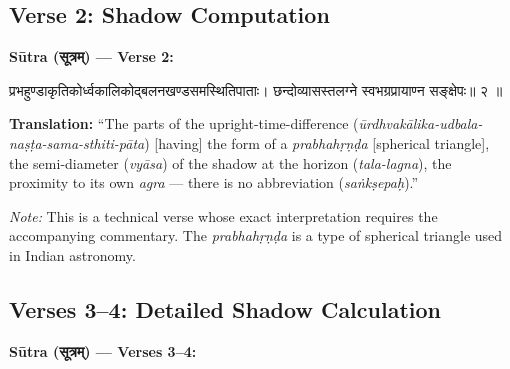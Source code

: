 \documentclass[11pt,a4paper]{article}
\newcommand{\dev}[1]{{\devanagarifont #1}}
\newenvironment{sanskritverse}{%
  \begin{center}\begin{minipage}{0.95\textwidth}
  \setlength{\leftskip}{1em}
  \setlength{\rightskip}{1em}
  \dev
}{\end{minipage}\end{center}}
\newenvironment{paracol}[1]{\begingroup}{\endgroup}
\newcommand{\switchcolumn}[1][]{%
  \ifnum#1=0\relax\else\par\nobreak\vspace{0.5em}\par\nobreak\fi%
}
\begin{document}
\subsection{Verse 2: Shadow Computation}

\vspace{0.5em}
\noindent\textbf{Sūtra (\dev{सूत्रम्}) — Verse 2:}

\begin{paracol}{2}

\begin{sanskritverse}
प्रभहुण्डाकृतिकोर्ध्वकालिकोद्बलनखण्डसमस्थितिपाताः।
छन्दोव्यासस्तलग्ने स्वभग्रप्रायाण्न सङ्क्षेपः॥ २ ॥
\end{sanskritverse}

\switchcolumn

\textbf{Translation:} ``The parts of the upright-time-difference (\textit{ūrdhvakālika-udbala-naṣṭa-sama-sthiti-pāta}) [having] the form of a \textit{prabhahṛṇḍa} [spherical triangle], the semi-diameter (\textit{vyāsa}) of the shadow at the horizon (\textit{tala-lagna}), the proximity to its own \textit{agra} --- there is no abbreviation (\textit{saṅkṣepaḥ}).''

\textit{Note:} This is a technical verse whose exact interpretation requires the accompanying commentary. The \textit{prabhahṛṇḍa} is a type of spherical triangle used in Indian astronomy.

\end{paracol}

\subsection{Verses 3--4: Detailed Shadow Calculation}

\vspace{0.5em}
\noindent\textbf{Sūtra (\dev{सूत्रम्}) — Verses 3--4:}
\end{document}
